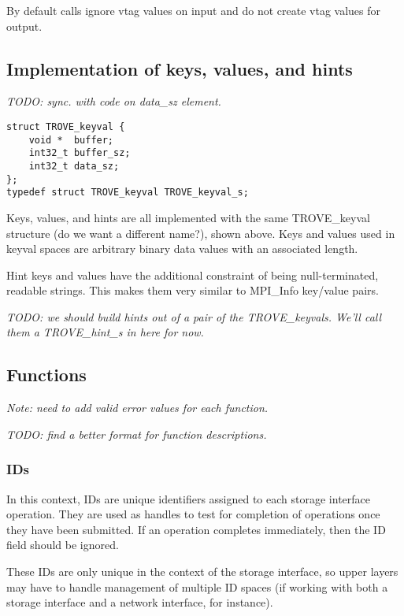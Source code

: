 \documentclass[10pt]{article} %
\begin{document}
By default calls ignore vtag values on input and do not create vtag values for output.

\subsection {Implementation of keys, values, and hints}

\emph{TODO: sync. with code on data\_sz element.}

\begin{verbatim}
struct TROVE_keyval {
    void *  buffer;
    int32_t buffer_sz;
    int32_t data_sz;
};
typedef struct TROVE_keyval TROVE_keyval_s;
\end{verbatim}

Keys, values, and hints are all implemented with the same TROVE\_keyval
structure (do we want a different name?), shown above.  Keys and values used
in keyval spaces are arbitrary binary data values with an associated length.

Hint keys and values have the additional constraint of being null-terminated,
readable strings.  This makes them very similar to MPI\_Info key/value pairs.

\emph{TODO: we should build hints out of a pair of the TROVE\_keyvals.  We'll
call them a TROVE\_hint\_s in here for now.}

\subsection{Functions}

\emph{Note: need to add valid error values for each function.}

\emph{TODO: find a better format for function descriptions.}

\subsubsection{IDs}

In this context, IDs are unique identifiers assigned to each storage interface
operation.  They are used as handles to test for completion of operations once
they have been submitted.  If an operation completes immediately, then the ID
field should be ignored.

These IDs are only unique in the context of the storage interface, so upper
layers may have to handle management of multiple ID spaces (if working with
both a storage interface and a network interface, for instance).
\end{document}
